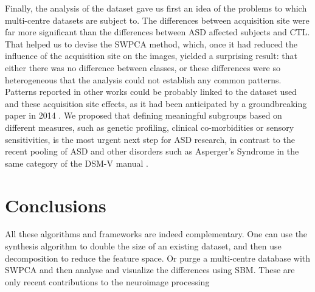 Finally, the analysis of the \aimsmri{} dataset gave us first an idea of the problems to which multi-centre datasets are subject to. The differences between acquisition site were far more significant than the differences between \ac{ASD} affected subjects and \ac{CTL}. That helped us to devise the \ac{SWPCA} method, which, once it had reduced the influence of the acquisition site on the images, yielded a surprising result: that either there was no difference between classes, or these differences were so heterogeneous that the analysis could not establish any common patterns. Patterns reported in other works could be probably linked to the dataset used and these acquisition site effects, as it had been anticipated by a groundbreaking paper in 2014 \cite{haar2014anatomical}. We proposed that defining meaningful subgroups based on different measures, such as genetic profiling, clinical co-morbidities or sensory sensitivities, is the most urgent next step for \ac{ASD} research, in contrast to the recent pooling of \ac{ASD} and other disorders such as Asperger's Syndrome in the same category of the DSM-V manual \cite{Association2013}. 


\section{Conclusions}


All these algorithms and frameworks are indeed complementary. One can use the synthesis algorithm to double the size of an existing dataset, and then use decomposition to reduce the feature space. Or purge a multi-centre database with \ac{SWPCA} and then analyse and visualize the differences using \ac{SBM}. These are only recent contributions to the neuroimage processing 

